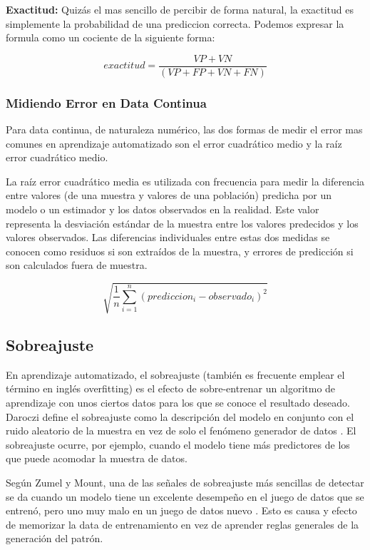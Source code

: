 \documentclass[letterpaper, spanish, 11pt]{report}
\begin{document}
\textbf{Exactitud:} Quizás el mas sencillo de percibir de forma natural, la exactitud es simplemente la probabilidad de una prediccion correcta. Podemos expresar la formula como un cociente de la siguiente forma:

\begin{equation}
exactitud = \frac{VP + VN}{(VP + FP + VN + FN)}
\end{equation}

\subsubsection{Midiendo Error en Data Continua}
Para data continua, de naturaleza numérico, las dos formas de medir el error mas comunes en aprendizaje automatizado son el error cuadrático medio y la raíz error cuadrático medio.


La raíz error cuadrático media es utilizada con frecuencia para medir la diferencia entre valores (de una muestra y valores de una población) predicha por un modelo o un estimador y los datos observados en la realidad. Este valor representa la desviación estándar de la muestra entre los valores predecidos y los valores observados. Las diferencias individuales entre estas dos medidas se conocen como residuos si son extraídos de la muestra, y errores de predicción si son calculados fuera de muestra.

\begin{equation}
\sqrt{\frac{1}{n}\sum_{i=1}^n(prediccion_{i} - observado_{i})^{2}}
\end{equation}

\subsection{Sobreajuste}
En aprendizaje automatizado, el sobreajuste (también es frecuente emplear el término en inglés overfitting) es el efecto de sobre-entrenar un algoritmo de aprendizaje con unos ciertos datos para los que se conoce el resultado deseado. Daroczi define el sobreajuste como la descripción del modelo en conjunto con el ruido aleatorio de la muestra en vez de solo el fenómeno generador de datos \cite{daroczi}. El sobreajuste ocurre, por ejemplo, cuando el modelo tiene más predictores de los que puede acomodar la muestra de datos.

Según Zumel y Mount, una de las señales de sobreajuste más sencillas de detectar se da cuando un modelo tiene un excelente desempeño en el juego de datos que se entrenó, pero uno muy malo en un juego de datos nuevo \cite{zumelMount}. Esto es causa y efecto de memorizar la data de entrenamiento en vez de aprender reglas generales de la generación del patrón.
\end{document}
